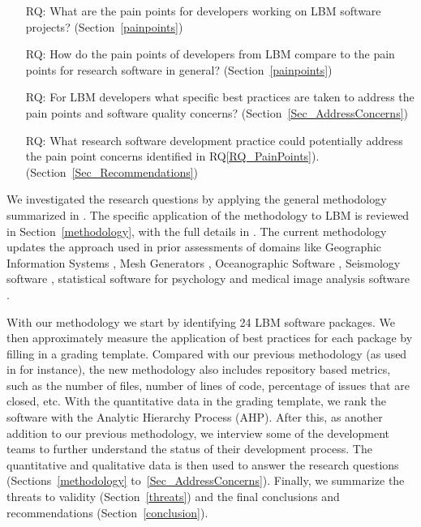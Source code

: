 \documentclass[final, 3p, times, authoryear]{elsarticle}
\newcounter{rqnum} %
\newcommand{\rqref}[1]{RQ\ref{#1}}
\begin{document}
\begin{enumerate}
	\item [RQ\refstepcounter{rqnum}\therqnum \label{RQ_PainPoints}:] What are
	the pain points for developers working on LBM software projects?
	(Section~\ref{painpoints})
	\item [RQ\refstepcounter{rqnum}\therqnum \label{RQ_ComparePainPoints}:] How
	do the pain points of developers from LBM compare to the pain points
	for research software in general? (Section~\ref{painpoints})
	\item [RQ\refstepcounter{rqnum}\therqnum \label{RQ_Concerns}:] For LBM
	developers what specific best practices are taken to address the pain points
	and software quality concerns? (Section~\ref{Sec_AddressConcerns})
	\item [RQ\refstepcounter{rqnum}\therqnum \label{RQ_Recommend}:]
	What research software development practice could potentially address the
	pain point concerns identified in \rqref{RQ_PainPoints}).
	(Section~\ref{Sec_Recommendations})
\end{enumerate}

We investigated the research questions by applying the general methodology
summarized in \citet{SmithEtAl2021}.  The specific application of the
methodology to LBM is reviewed in Section~\ref{methodology}, with the full
details in \citep{Michalski2021}.  The current methodology updates the approach
used in prior assessments of domains like Geographic Information Systems
\citep{SmithEtAl2018_arXivGIS}, Mesh Generators \citep{SmithEtAl2016},
Oceanographic Software \citep{smith2015state}, Seismology software
\citep{SmithEtAl2018}, statistical software for psychology
\citep{SmithEtAl2018_StatSoft} and medical image analysis software
\citep{Dong2021}.

With our methodology we start by identifying 24 LBM software packages.  We then
approximately measure the application of best practices for each package by
filling in a grading template. Compared with our previous methodology (as used
in \citep{SmithEtAl2016} for instance), the new methodology also includes
repository based metrics, such as the number of files, number of lines of code,
percentage of issues that are closed, etc.  With the quantitative data in the
grading template, we rank the software with the Analytic Hierarchy Process
(AHP). After this, as another addition to our previous methodology, we interview
some of the development teams to further understand the status of their
development process. The quantitative and qualitative data is then used to
answer the research questions (Sections~\ref{methodology}
to~\ref{Sec_AddressConcerns}).  Finally, we summarize the threats to validity
(Section~\ref{threats}) and the final conclusions and recommendations
(Section~\ref{conclusion}).
\end{document}
